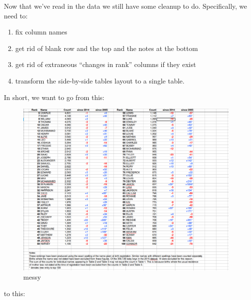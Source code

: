 \documentclass[]{book}
\providecommand{\tightlist}{%
  \setlength{\itemsep}{0pt}\setlength{\parskip}{0pt}}
\begin{document}
Now that we've read in the data we still have some cleanup to do.
Specifically, we need to:

\begin{enumerate}
\def\labelenumi{\arabic{enumi}.}
\tightlist
\item
  fix column names
\item
  get rid of blank row and the top and the notes at the bottom
\item
  get rid of extraneous ``changes in rank'' columns if they exist
\item
  transform the side-by-side tables layout to a single table.
\end{enumerate}

In short, we want to go from this:

\begin{figure}
\centering
\includegraphics{R/RDataWrangling/images/messy.png}
\caption{messy}
\end{figure}

to this:
\end{document}
